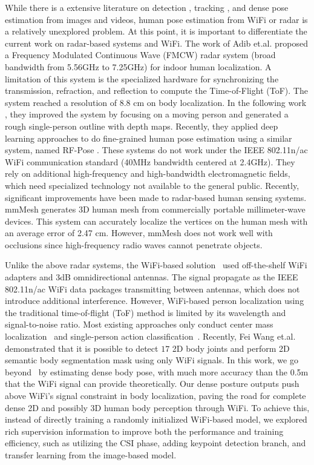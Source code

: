 \documentclass[sigconf, anonymous=false]{acmart}
\begin{document}
While there is a extensive literature on detection \cite{region_proposal,yolov3}, tracking \cite{posetrack,simple_tracking}, 
and dense pose estimation \cite{DensePose,ContinuousSurfaceEmbeddings} from images and videos, human pose estimation
from WiFi or radar is a relatively unexplored problem. At this point, it is important to differentiate the current work on radar-based systems and WiFi.  The work of Adib et.al. \cite{radar} proposed a Frequency Modulated Continuous Wave (FMCW) radar system (broad bandwidth from 5.56GHz to 7.25GHz) for indoor human localization. A limitation of this system is the specialized hardware for synchronizing the transmission, refraction, and reflection to compute the Time-of-Flight (ToF). The system reached a resolution of 8.8 cm on body localization. In the following work \cite{RF-capture}, they improved the system by focusing on a moving person and generated a rough single-person outline with depth maps. Recently, they applied deep learning approaches to do fine-grained human pose estimation using a similar system, named RF-Pose \cite{RF-Pose}. These systems do not work under the IEEE 802.11n/ac WiFi communication standard (40MHz bandwidth centered at 2.4GHz). They rely on additional high-frequency and high-bandwidth electromagnetic fields, which need specialized technology not available to the general public. Recently, significant improvements have been made to radar-based human sensing systems. mmMesh \cite{xue2021mmmesh} generates 3D human mesh from commercially portable millimeter-wave devices. This system can accurately localize the vertices on the human mesh with an average error of 2.47 cm. However, mmMesh does not work well with occlusions since high-frequency radio waves cannot penetrate objects. 
 
Unlike the above radar systems, the WiFi-based solution~\cite{Person-in-wifi,wi2vi} used off-the-shelf WiFi adapters and 3dB omnidirectional antennas. The signal propagate as the IEEE 802.11n/ac WiFi data packages transmitting between antennas, which does not introduce additional interference.  However, WiFi-based person localization using the traditional time-of-flight (ToF) method is limited by its wavelength and signal-to-noise ratio. Most existing approaches only conduct center mass localization~\cite{BASRI2016,Soltanaghaei2018} and single-person action classification~\cite{Sheng2020,WangSong2019}.  Recently, 
Fei Wang et.al.~\cite{Wanghuang2019} demonstrated that it is possible to detect $17$ 2D body joints and perform 2D semantic body segmentation mask using only WiFi signals. In this work, we go beyond~\cite{Wanghuang2019} by estimating dense body pose, with much more accuracy than the 0.5m that the WiFi signal can provide theoretically.
Our dense posture outputs push above WiFi's signal constraint in body localization, 
paving the road for complete dense 2D and possibly 3D human body perception through WiFi. To achieve this, instead of directly training a randomly initialized WiFi-based model, we explored rich supervision information to improve both the performance and training efficiency, such as utilizing the CSI phase, adding keypoint detection branch, and transfer learning from the image-based model. 
\end{document}

